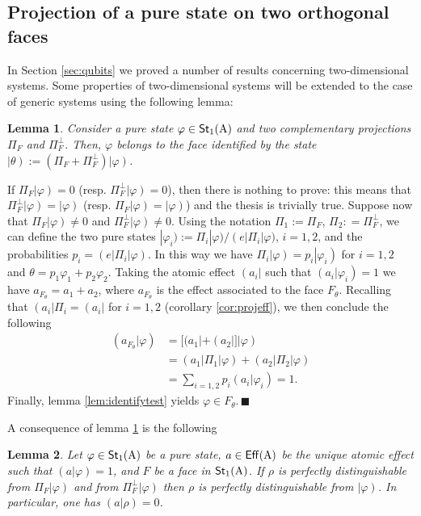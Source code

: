 \documentclass[12pt,aps,pra,showpacs,groupedaddress]{revtex4-1}
\newtheorem{lemma}{Lemma} \newtheorem{proposition}{Proposition}
\def\Proof{\medskip\par\noindent{\bf Proof. }}
\def\qed{$\,\blacksquare$\par}
\def\Cntset{{\mathsf{Eff}}}
\def\Stset{{\mathsf{St}}}
\def\K#1{\left|#1\right)}  \def\B#1{\left(#1\right|}
\def\SC#1#2{\left(#1\right|\left.\!#2\right)}  \def\Tr{{\rm Tr}}
\begin{document}
\subsection{Projection of a pure state on two orthogonal faces}

In Section \ref{sec:qubits} we proved a number of results concerning two-dimensional systems.  Some
properties of two-dimensional systems will be extended to the case of generic systems using the
following lemma:

\begin{lemma}
  Consider a pure state $\varphi\in\Stset_1(\rA)$ and two complementary projections $\Pi_F$ and
  $\Pi^\perp_{F}$. Then, $\varphi$ belongs to the face identified by the state
  $\K\theta:=(\Pi_F+\Pi^\perp_{F})\K \varphi$.
  \label{lem:prorefin}
\end{lemma}

\Proof If $\Pi_F \K\varphi = 0$ (resp. $\Pi_{F}^\perp \K \varphi = 0$), then there is nothing to
prove: this means that $\Pi_{F}^\perp \K \varphi =\K \varphi$ (resp.  $\Pi_{F} \K \varphi =\K
\varphi$) and the thesis is trivially true.  Suppose now that $\Pi_F\K \varphi \not= 0$ and
$\Pi_{F}^\perp \K \varphi \not = 0$.  Using the notation $\Pi_1:= \Pi_F$, $\Pi_2 : = \Pi_F^\perp$, we can
define the two pure states $|\varphi_i):=\Pi_i|\varphi)/ \B e \Pi_i|\varphi)$, $i=1,2$, and the
probabilities $p_i = \B e \Pi_i \K \varphi$. In this way we have $\Pi_i\K{\varphi}=p_i\K{\varphi_i}$
for $i=1,2$ and $\theta = p_1 \varphi_1 + p_2 \varphi_2$.  Taking the atomic effect $\B {a_i}$ such
that $\SC {a_i}{\varphi_i}=1$ we have $a_{F_\theta} = a_1 + a_2$, where $a_{F_\theta}$ is the effect
associated to the face $F_\theta$.  Recalling that $\B {a_i} \Pi_i = \B{a_i}$ for $i=1,2$ (corollary
\ref{cor:projeff}), we then conclude the following
\begin{equation*}
  \begin{split}
    (a_{F_\theta}|\varphi) &=[(a_1|+(a_2|]|\varphi)\\
    &= (a_1|   \Pi_1 |\varphi) +  (a_2| \Pi_2|\varphi)\\
    & = \sum_{i=1,2}  p_i  \SC {a_i}  {\varphi_i} =1.
  \end{split}
\end{equation*}
Finally, lemma \ref{lem:identifytest} yields $\varphi\in F_\theta$.\qed



A  consequence of lemma \ref{lem:prorefin}  is the following
\begin{lemma}\label{lem:senzanome}
  Let $\varphi \in \Stset_1 (\rA)$ be a pure state, $a \in \Cntset(\rA)$ be the unique atomic
  effect such that $\SC {a} \varphi=1$, and $F$ be a face in $\Stset_1(\rA)$. If $\rho$ is
  perfectly distinguishable from $\Pi_F \K \varphi$ and from $\Pi^\perp_{F} \K \varphi $ then $\rho$
  is perfectly distinguishable from $\K \varphi$.  In particular, one has $\SC {a} \rho =0$.
\end{lemma}
\end{document}

